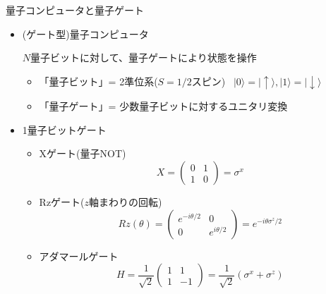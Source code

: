 \begin{frame}[t,fragile]{量子コンピュータと量子ゲート}
  \begin{itemize}
  \item (ゲート型)量子コンピュータ

    $N$量子ビットに対して、量子ゲートにより状態を操作

    \begin{itemize}
    \item 「量子ビット」= 2準位系($S=1/2$スピン) \ $|0\rangle=|\!\uparrow\rangle, |1\rangle=|\!\downarrow\rangle$
    \item 「量子ゲート」= 少数量子ビットに対するユニタリ変換
    \end{itemize}
  \item 1量子ビットゲート
    \begin{itemize}
    \item Xゲート(量子NOT)
      \[
      X = \begin{pmatrix} 0 & 1 \\ 1 & 0 \end{pmatrix} = \sigma^x
      \]
    \item Rzゲート($z$軸まわりの回転)
      \[
      Rz(\theta) = \begin{pmatrix} e^{-i\theta/2} & 0 \\ 0 & e^{i\theta/2} \end{pmatrix} = e^{-i\theta\sigma^z/2}
      \]
    \item アダマールゲート
      \[
      H = \frac{1}{\sqrt{2}} \begin{pmatrix} 1 & 1 \\ 1 & -1 \end{pmatrix} = \frac{1}{\sqrt{2}} (\sigma^x + \sigma^z)
      \]
    \end{itemize}
  \end{itemize}
\end{frame}
